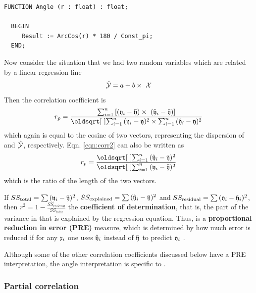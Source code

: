 \begin{refsection}
\begin{lstlisting}[caption= Convert correlation to angle]
  FUNCTION Angle (r : float) : float;

  BEGIN
     Result := ArcCos(r) * 180 / Const_pi;
  END;
\end{lstlisting}

Now consider the situation that we had two random variables  which are related by a linear regression line
\begin{equation}
  \hat{\mathcal{Y}} = a + b \times\ \mathcal{X}
\end{equation}
Then the correlation coefficient is
\begin{equation} \label{eqn:corr2}
  r_p = \frac{\sum_{i=1}^n{[(\AbsVec{y}_i - \bar{\AbsVec{y}}) \times\ (\hat{\AbsVec{y}}_i - \bar{\AbsVec{y}}) ]}}{\sqrt{\sum_{i=1}^n{(\AbsVec{y}_i - \bar{\AbsVec{y}})^2} \times \sum_{i=1}^n{(\hat{\AbsVec{y}}_i - \bar{\AbsVec{y}})^2}}}
\end{equation}
which again is equal to the cosine of two vectors, representing the dispersion of  and \(\hat{\mathcal{Y}} \), respectively. Eqn. \ref{eqn:corr2} can also be written as
\begin{equation}
  r_p = \frac{\sqrt{\sum_{i=1}^n{(\hat{\AbsVec{y}}_i - \bar{\AbsVec{y}})^2}}}{\sqrt{\sum_{i=1}^n{(\AbsVec{y}_i - \bar{\AbsVec{y}})^2}}}
\end{equation}
which is the ratio of the length of the two vectors.

If \(SS_\mathrm{total} = \sum{(\ensuremath{\mathfrak{y}}_i - \bar{\ensuremath{\mathfrak{y}}})^2} \), \(SS_\mathrm{explained} = \sum{(\hat{\ensuremath{\mathfrak{y}}}_i - \bar{\ensuremath{\mathfrak{y}}})^2} \) and \(SS_\mathrm{residual} = \sum{(\ensuremath{\mathfrak{y}}_i - \hat{\ensuremath{\mathfrak{y}}}_i)^2} \), then \(r^2 = 1 - \frac{SS_\mathrm{residual}}{SS_{total}} \) the \textbf{coefficient of determination}, that is, the part of the variance in  that is explained by the regression equation. Thus,  is a \textbf{proportional reduction in error (PRE)} measure, which is determined by how much error is reduced if for any \(\mathfrak{x}_i \) one uses \(\hat{\mathfrak{y}}_i \) instead of \(\bar{\mathfrak{y}} \) to predict \(\mathfrak{y}_i \) \parencite{Cos-65}.

Although some of the other correlation coefficients discussed below have a PRE interpretation, the angle interpretation is specific to .

\subsubsection{Partial correlation}


\end{refsection}

